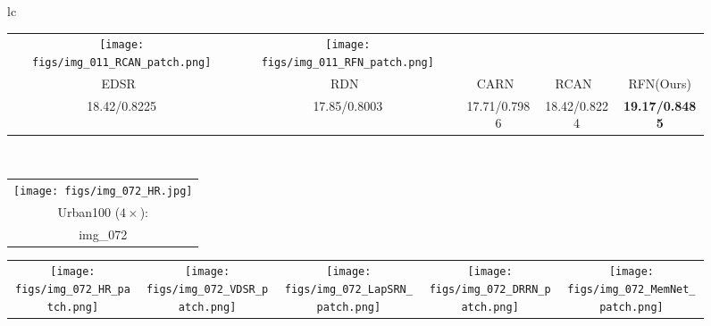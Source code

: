 \documentclass[preprint]{elsarticle}
\begin{document}
\begin{figure*}[htpb]
{\begin{tabular}{lc}
\begin{adjustbox}{valign=t}
\begin{tabular}{ccccc}
				\hspace{-3mm}
				\texttt{[image: figs/img\_011\_RCAN\_patch.png]} &
				\hspace{-3mm}
				\texttt{[image: figs/img\_011\_RFN\_patch.png]} \\
				EDSR~\cite{EDSR} &\hspace{-3mm} RDN~\cite{RDN} &\hspace{-3mm} CARN~\cite{CARN} &\hspace{-3mm} RCAN~\cite{RCAN} &\hspace{-3mm} RFN(Ours) \\
				18.42/0.8225 &\hspace{-3mm} 17.85/0.8003 &\hspace{-3mm} 17.71/0.7986 &\hspace{-3mm} 18.42/0.8224 &\hspace{-3mm} \textbf{19.17/0.8485} \\
			\end{tabular}
		\end{adjustbox}
		\\
		\begin{adjustbox}{valign=t}
			\scriptsize
			\begin{tabular}{c}
				\texttt{[image: figs/img\_072\_HR.jpg]} \\
				Urban100 ($4 \times$): \\
				img\_072 \\
			\end{tabular}
		\end{adjustbox}
		\hspace{-4mm}
		\begin{adjustbox}{valign=t}
			\scriptsize
			\begin{tabular}{ccccc}
				\texttt{[image: figs/img\_072\_HR\_patch.png]} &
				\hspace{-3mm}
				\texttt{[image: figs/img\_072\_VDSR\_patch.png]} &
				\hspace{-3mm}
				\texttt{[image: figs/img\_072\_LapSRN\_patch.png]} & 
				\hspace{-3mm}
				\texttt{[image: figs/img\_072\_DRRN\_patch.png]} &
				\hspace{-3mm}
				\texttt{[image: figs/img\_072\_MemNet\_patch.png]} \\

\end{tabular}
\end{adjustbox}
\end{tabular}}
\end{figure*}
\end{document}
